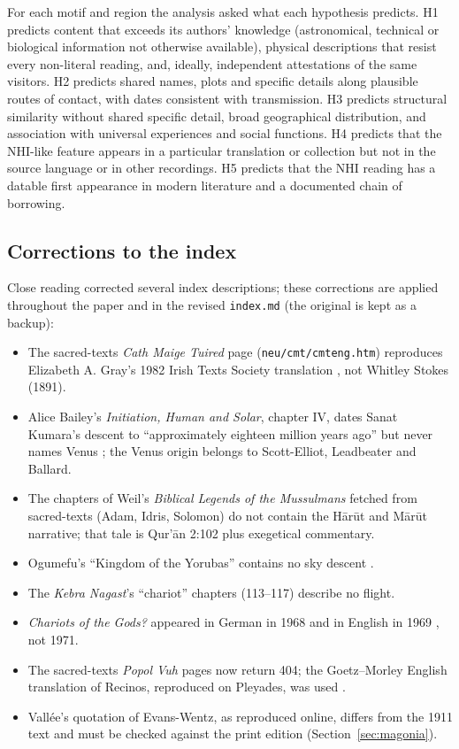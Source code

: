 \documentclass[11pt,a4paper]{article}
\begin{document}
For each motif and region the analysis asked what each hypothesis predicts. H1 predicts content that exceeds its authors' knowledge (astronomical, technical or biological information not otherwise available), physical descriptions that resist every non-literal reading, and, ideally, independent attestations of the same visitors. H2 predicts shared names, plots and specific details along plausible routes of contact, with dates consistent with transmission. H3 predicts structural similarity without shared specific detail, broad geographical distribution, and association with universal experiences and social functions. H4 predicts that the NHI-like feature appears in a particular translation or collection but not in the source language or in other recordings. H5 predicts that the NHI reading has a datable first appearance in modern literature and a documented chain of borrowing.

\subsection{Corrections to the index}\label{sec:corrections}

Close reading corrected several index descriptions; these corrections are applied throughout the paper and in the revised \texttt{index.md} (the original is kept as a backup):
\begin{itemize}[itemsep=1pt]
\item The sacred-texts \emph{Cath Maige Tuired} page (\texttt{neu/cmt/cmteng.htm}) reproduces Elizabeth A. Gray's 1982 Irish Texts Society translation \parencite{gray1982cmt}, not Whitley Stokes (1891).
\item Alice Bailey's \emph{Initiation, Human and Solar}, chapter IV, dates Sanat Kumara's descent to ``approximately eighteen million years ago'' but never names Venus \parencite{bailey1922initiation}; the Venus origin belongs to Scott-Elliot, Leadbeater and Ballard.
\item The chapters of Weil's \emph{Biblical Legends of the Mussulmans} fetched from sacred-texts (Adam, Idris, Solomon) do not contain the Hārūt and Mārūt narrative; that tale is Qur'ān 2:102 plus exegetical commentary.
\item Ogumefu's ``Kingdom of the Yorubas'' contains no sky descent \parencite{ogumefu1929yoruba}.
\item The \emph{Kebra Nagast}'s ``chariot'' chapters (113--117) describe no flight.
\item \emph{Chariots of the Gods?} appeared in German in 1968 and in English in 1969 \parencite{daniken1968erinnerungen,vondaniken1969chariots}, not 1971.
\item The sacred-texts \emph{Popol Vuh} pages now return 404; the Goetz--Morley English translation of Recinos, reproduced on Pleyades, was used \parencite{goetz1950popol}.
\item Vallée's quotation of Evans-Wentz, as reproduced online, differs from the 1911 text and must be checked against the print edition (Section~\ref{sec:magonia}).
\end{itemize}
\end{document}
